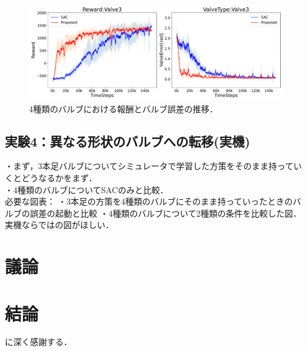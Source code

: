 \documentclass[dvipdfmx]{ampbt_nomag}
\def\numberofspines{1}
\begin{document}
\begin{figure}[H]
  \centering
  \includegraphics[width=16cm]
       {asset/img/HardwareTurn180.pdf}
  \caption{4種類のバルブにおける報酬とバルブ誤差の推移．}
  \label{dclaw_mujoco}
\end{figure}

\subsection{実験4：異なる形状のバルブへの転移(実機)}
・まず，3本足バルブについてシミュレータで学習した方策をそのまま持っていくとどうなるかをまず．\\
・4種類のバルブについてSACのみと比較．\\
必要な図表：
・3本足の方策を4種類のバルブにそのまま持っていったときのバルブの誤差の起動と比較
・4種類のバルブについて2種類の条件を比較した図．\\
実機ならではの図がほしい．


\clearpage
\section{議論}\label{sec-discussion}

\clearpage
\section{結論}\label{sec-conclusion}



\acknowledgment
に深く感謝する．




\appendix


\fi
\ifoutputcover
\cleardoublepage
\makecover                      %
\makespine[\numberofspines]     %
\fi
\ifoutputabstractforsubmission
\makeabstractforsubmission      %
\fi
\end{document}
